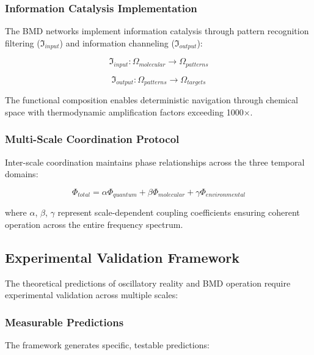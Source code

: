 \subsubsection{Information Catalysis Implementation}

The BMD networks implement information catalysis through pattern recognition filtering ($\mathfrak{I}_{input}$) and information channeling ($\mathfrak{I}_{output}$):

\begin{equation}
\mathfrak{I}_{input}: \Omega_{molecular} \rightarrow \Omega_{patterns}
\end{equation}

\begin{equation}
\mathfrak{I}_{output}: \Omega_{patterns} \rightarrow \Omega_{targets}
\end{equation}

The functional composition enables deterministic navigation through chemical space with thermodynamic amplification factors exceeding 1000×.

\subsubsection{Multi-Scale Coordination Protocol}

Inter-scale coordination maintains phase relationships across the three temporal domains:

\begin{equation}
\Phi_{total} = \alpha \Phi_{quantum} + \beta \Phi_{molecular} + \gamma \Phi_{environmental}
\end{equation}

where $\alpha$, $\beta$, $\gamma$ represent scale-dependent coupling coefficients ensuring coherent operation across the entire frequency spectrum.

\subsection{Experimental Validation Framework}

The theoretical predictions of oscillatory reality and BMD operation require experimental validation across multiple scales:

\subsubsection{Measurable Predictions}

The framework generates specific, testable predictions:


